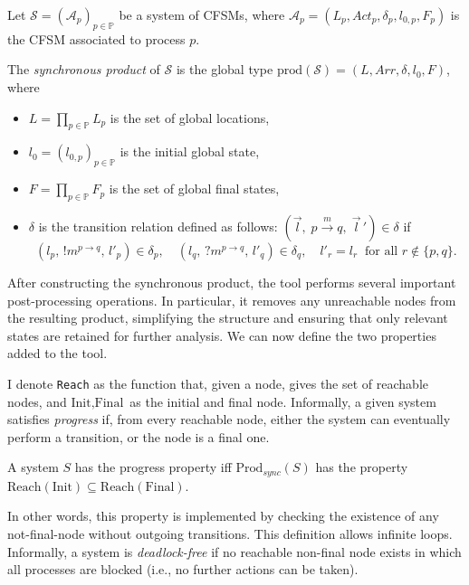 \begin{definition}
Let $\mathcal{S} = (\mathcal{A}_p)_{p \in \mathbb{P}}$ be a system of CFSMs, where 
$\mathcal{A}_p = (L_p, \mathit{Act}_p, \delta_p, l_{0,p}, F_p)$ is the CFSM associated 
to process $p$.  

The \emph{synchronous product} of $\mathcal{S}$ is the global type 
$\mathrm{prod}(\mathcal{S}) = (L, \mathit{Arr}, \delta, l_0, F)$,
where
\begin{itemize}
    \item $L = \prod_{p \in \mathbb{P}} L_p$ is the set of global locations,
    \item $l_0 = (l_{0,p})_{p \in \mathbb{P}}$ is the initial global state,
    \item $F = \prod_{p \in \mathbb{P}} F_p$ is the set of global final states,
    \item $\delta$ is the transition relation defined as follows:  
    $(\vec{l}, \; p \xrightarrow{m} q, \; \vec{l}\,') \in \delta$ if
    \[
    (l_p,\, !m^{p \to q},\, l'_p) \in \delta_p, \quad 
    (l_q,\, ?m^{p \to q},\, l'_q) \in \delta_q, \quad 
    l'_r = l_r \;\; \text{for all } r \notin \{p,q\}.
    \]
\end{itemize}
\end{definition}

After constructing the synchronous product, the tool performs several
important post-processing operations. In particular, it removes any
unreachable nodes from the resulting product, simplifying the structure
and ensuring that only relevant states are retained for further analysis.
We can now define the two properties added to the tool.

I denote \verb|Reach| as the function that, given a node, gives the set of 
reachable nodes, and $\text{Init}, \text{Final}$ as the initial and final node.
Informally, a given system satisfies \emph{progress} if, 
from every reachable node,
either the system can eventually perform a transition, or the node is
a final one.
\begin{definition}[Progress]
	A system $S$ has the progress property iff $\text{Prod}_{sync}(S)$
	has the property
	$\text{Reach}(\text{Init})\subseteq \text{Reach}(\text{Final})$.
\end{definition}


In other words, this property is implemented by checking the existence of 
any not-final-node without outgoing transitions.
This definition allows infinite loops.
Informally, a system is \emph{deadlock-free} if no reachable
non-final node exists in which all processes are blocked (i.e., no further
actions can be taken).

